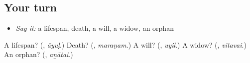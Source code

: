 \subsection*{Your turn}
\begin{itemize}
\raggedright
  \item \emph{Say it:} a lifespan, death, a will, a widow, an orphan
\end{itemize}

\begin{tcolorbox}[breakable,colback=teal!4,colframe=teal!35!black,title={Before you move on}]
A lifespan? (\textbf{}, \emph{āyuḷ}.) Death? (\textbf{}, \emph{maraṇam}.) A will? (\textbf{}, \emph{uyil}.) A widow? (\textbf{}, \emph{vitavai}.) An orphan? (\textbf{}, \emph{aṉātai}.)
\end{tcolorbox}
